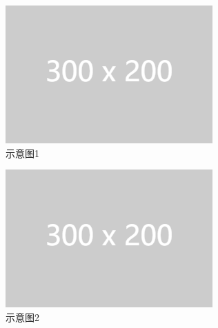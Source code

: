 \documentclass[zihao=-4]{ctexart}
\begin{document}
\begin{spacing}{1.5}
\begin{figure}[htbp]
  \begin{subfigure}{0.48\textwidth}
    \includegraphics[width=\linewidth]{example-image-1.png}
    \caption{示意图1} \label{fig:8a}
  \end{subfigure}%
  \hspace*{\fill}   %
  \begin{subfigure}{0.48\textwidth}
    \includegraphics[width=\linewidth]{example-image-1.png}
    \caption{示意图2} \label{fig:8b}
  \end{subfigure}\\
  \begin{subfigure}{0.48\textwidth}

\end{subfigure}
\end{figure}
\end{spacing}
\end{document}
